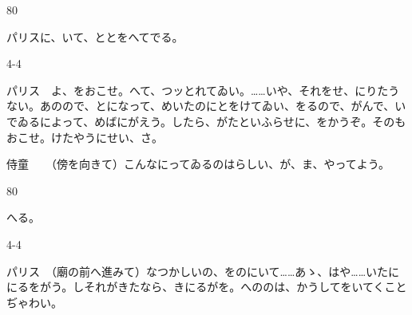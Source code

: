 \documentclass[tate,paper=b6j,jafontsize=9pt]{jlreq}
\begin{document}
\begin{azconvIndented}{8\zw}{0\zw}

パリスに、いて、ととをへてでる。

\end{azconvIndented}
\begin{azconvIndented}{4\zw}{-4\zw}

パリス　よ、をおこせ。へて、つッとれてゐい。……いや、それをせ、にりたうない。あのので、とになって、めいたのにとをけてゐい、をるので、がんで、いでゐるによって、めばにがえう。したら、がたといふらせに、をかうぞ。そのもおこせ。けたやうにせい、さ。

侍童　　（傍を向きて）こんなにってゐるのはらしい、が、ま、やってよう。

\end{azconvIndented}
\begin{azconvIndented}{8\zw}{0\zw}

へる。

\end{azconvIndented}
\begin{azconvIndented}{4\zw}{-4\zw}

パリス　（廟の前へ進みて）なつかしいの、をのにいて……あゝ、はや……いたににるをがう。しそれがきたなら、きにるがを。へののは、かうしてをいてくことぢゃわい。

\end{azconvIndented}
\end{document}
